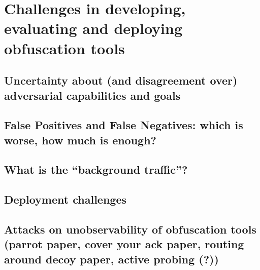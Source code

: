 %
\section{Challenges in developing, evaluating and deploying obfuscation tools}
\label{section:challenges}
     
     
\subsection{Uncertainty about (and disagreement over) adversarial capabilities
and goals}
\subsection{False Positives and False Negatives: which is worse, how much is
enough?}
\subsection{What is the ``background traffic''?}
\subsection{Deployment challenges}
\subsection{Attacks on unobservability of obfuscation tools (parrot paper, cover
your ack paper, routing around decoy paper, active probing (?))}


